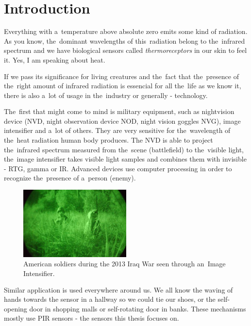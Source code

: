 \chapter{Introduction}
\label{chapter:introduction}

Everything with a~temperature above absolute zero emits some kind of radiation. As you know, the~dominant wavelengths of this~radiation belong to the~infrared spectrum and we have biological sensors called {\it thermoreceptors} in our skin to feel it. Yes, I am speaking about heat. 

If we pass its significance for living creatures and the~fact that the~presence of the~right amount of infrared radiation is essencial for all the~life as we know it, there is also a~lot of usage in the~industry or generally - technology.

The~first that might come to mind is military equipment, such as nightvision device (NVD, night observation device NOD, night vision goggles NVG), image intensifier and a~lot of others.
They are very sensitive for the~wavelength of the~heat radiation human body produces.
The NVD is able to project the~infrared spectrum measured from the~scene (battlefield) to the~visible light, the~image intensifier takes visible light samples and combines them with invisible - RTG, gamma or IR.
Advanced devices use computer processing in order to recognize the~presence of a~person (enemy).

\begin{figure}[h!]
  \begin{center}
    \includegraphics[width=0.5\textwidth]{obrazky-figures/nightvision.jpg}
    \caption{American soldiers during the 2013 Iraq War seen through an~Image Intensifier.\cite{nightvision} \label{fig:nightvision}}
  \end{center}
\end{figure}

Similar application is used everywhere around us. We all know the waving of hands towards the sensor in a hallway so we could tie our shoes,
or the self-opening door in shopping malls or self-rotating door in banks. These mechanisms mostly use PIR sensors - the
sensors this thesis focuses on.

